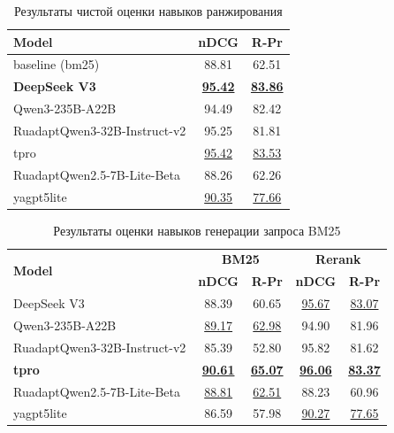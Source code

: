 \documentclass{article}
\begin{document}
\begin{table}[ht!]
\centering
\caption{Результаты чистой оценки навыков ранжирования}
\begin{tabular}{l|c|c}
\hline
\textbf{Model} & \textbf{nDCG} & \textbf{R‑Pr} \\
\hline
baseline (bm25)                                     & 88.81 & 62.51 \\
\hline
\textbf{DeepSeek V3}                                & \uline{\textbf{95.42}} & \uline{\textbf{83.86}} \\
Qwen3-235B-A22B                                     & 94.49 & 82.42 \\
\hline
RuadaptQwen3-32B-Instruct-v2                        & 95.25 & 81.81 \\
tpro                                                & \uline{95.42} & \uline{83.53} \\
\hline
RuadaptQwen2.5-7B-\allowbreak Lite-\allowbreak Beta & 88.26 & 62.26 \\
yagpt5lite                                          & \uline{90.35} & \uline{77.66} \\
\hline
\end{tabular}
\label{tab:query_ref}
\end{table}

\begin{table}[ht]
\centering
\caption{Результаты оценки навыков генерации запроса BM25}
\begin{tabular}{l|cc|cc}
\hline
\multirow{2}{*}{\textbf{Model}} & \multicolumn{2}{c|}{\textbf{BM25}} & \multicolumn{2}{c}{\textbf{Rerank}} \\
 & \textbf{nDCG} & \textbf{R-Pr} & \textbf{nDCG} & \textbf{R-Pr} \\
\hline
DeepSeek V3                                         & 88.39 & 60.65 & \uline{95.67} & \uline{83.07} \\
Qwen3-235B-A22B                                     & \uline{89.17} & \uline{62.98} & 94.90 & 81.96 \\
\hline
RuadaptQwen3-32B-Instruct-v2                        & 85.39 & 52.80 & 95.82 & 81.62 \\
\textbf{tpro}                                       & \uline{\textbf{90.61}} & \uline{\textbf{65.07}} & \uline{\textbf{96.06}} & \uline{\textbf{83.37}} \\
\hline
RuadaptQwen2.5-7B-\allowbreak Lite-\allowbreak Beta & \uline{88.81} & \uline{62.51} & 88.23 & 60.96 \\
yagpt5lite                                          & 86.59 & 57.98 & \uline{90.27} & \uline{77.65} \\
\hline
\end{tabular}
\label{tab:query_def}
\end{table}
\end{document}
